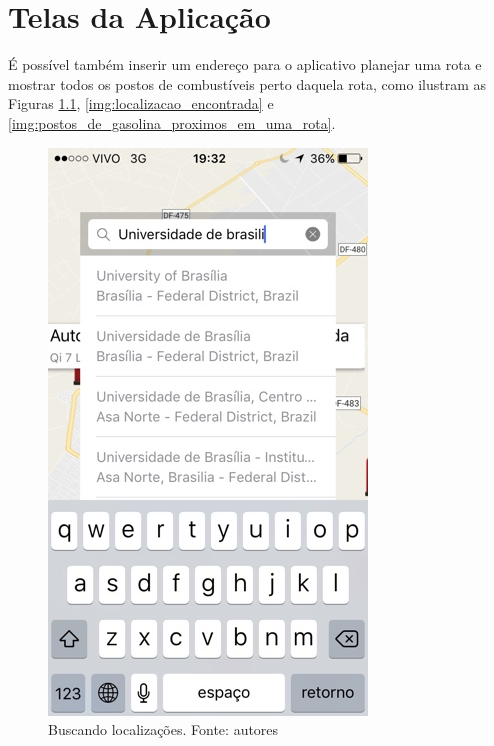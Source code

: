 
\chapter{Telas da Aplicação}
\label{chap:telas}

É possível também inserir um endereço para o aplicativo planejar uma rota e mostrar todos os postos de combustíveis perto daquela rota, como ilustram as Figuras \ref{img:buscando_localizacoes}, \ref{img:localizacao_encontrada} e \ref{img:postos_de_gasolina_proximos_em_uma_rota}.

\begin{figure}[H]
    \centering
    \includegraphics[scale=0.5]{figuras/app_3.jpg}
    \caption[Buscando localizações]{Buscando localizações. Fonte: autores}
    \label{img:buscando_localizacoes}
\end{figure}

